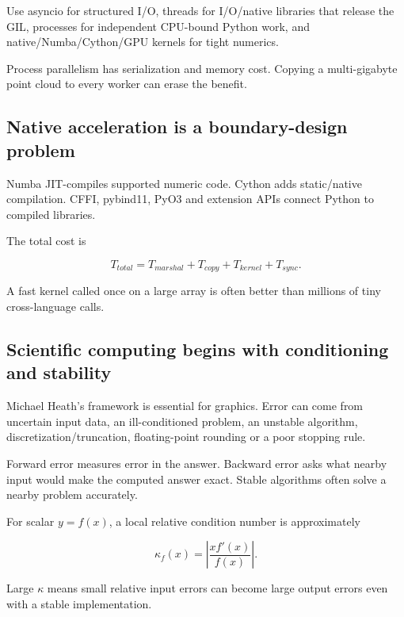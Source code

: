 Use asyncio for structured I/O, threads for I/O/native libraries that release the GIL, processes for independent CPU-bound Python work, and native/Numba/Cython/GPU kernels for tight numerics.

Process parallelism has serialization and memory cost. Copying a multi-gigabyte point cloud to every worker can erase the benefit.

\subsection{Native acceleration is a boundary-design problem}\label{01-foundations-i-ch017-native-acceleration-is-a-boundary-design-problem}

\hypertarget{01-foundations-i-ch017-native-acceleration-is-a-boundary-design-problem}{}

Numba JIT-compiles supported numeric code. Cython adds static/native compilation. CFFI, pybind11, PyO3 and extension APIs connect Python to compiled libraries.

The total cost is

\[
T_{total}=T_{marshal}+T_{copy}+T_{kernel}+T_{sync}.
\]

A fast kernel called once on a large array is often better than millions of tiny cross-language calls.

\subsection{Scientific computing begins with conditioning and stability}\label{01-foundations-i-ch017-scientific-computing-begins-with-conditioning-and-stability}

\hypertarget{01-foundations-i-ch017-scientific-computing-begins-with-conditioning-and-stability}{}

Michael Heath's framework is essential for graphics. Error can come from uncertain input data, an ill-conditioned problem, an unstable algorithm, discretization/truncation, floating-point rounding or a poor stopping rule.

Forward error measures error in the answer. Backward error asks what nearby input would make the computed answer exact. Stable algorithms often solve a nearby problem accurately.

For scalar \(y=f(x)\), a local relative condition number is approximately

\[
\kappa_f(x)=\left|\frac{x f'(x)}{f(x)}\right|.
\]

Large \(\kappa\) means small relative input errors can become large output errors even with a stable implementation.

